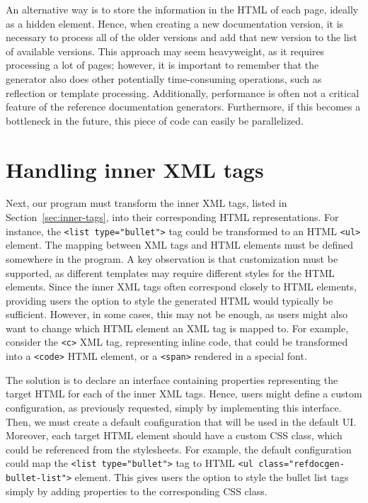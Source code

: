 An alternative way is to store the information in the HTML of each page, ideally as a hidden element. 
Hence, when creating a new documentation version, it is necessary to process all of the older versions and add that new version to the list of available versions.
This approach may seem heavyweight, as it requires processing a lot of pages; however, it is important to remember that the generator also does other potentially time-consuming operations, such as reflection or template processing.
Additionally, performance is often not a critical feature of the reference documentation generators.
Furthermore, if this becomes a bottleneck in the future, this piece of code can easily be parallelized.

\section{Handling inner XML tags}
\label{sec:inner-xml-to-html}

Next, our program must transform the inner XML tags, listed in Section~\ref{sec:inner-tags}, into their corresponding HTML representations.
For instance, the \texttt{<list ty\-pe="bullet">} tag could be transformed to an HTML \texttt{<ul>} element.
The mapping between XML tags and HTML elements must be defined somewhere in the program.
A key observation is that customization must be supported, as different templates may require different styles for the HTML elements.
Since the inner XML tags often correspond closely to HTML elements, providing users the option to style the generated HTML would typically be sufficient.
However, in some cases, this may not be enough, as users might also want to change which HTML element an XML tag is mapped to.
For example, consider the \texttt{<c>} XML tag, representing inline code, that could be transformed into a \texttt{<code>} HTML element, or a \texttt{<span>} rendered in a special font.

The solution is to declare an interface containing properties representing the target HTML for each of the inner XML tags.
Hence, users might define a custom configuration, as previously requested, simply by implementing this interface.
Then, we must create a default configuration that will be used in the default UI.
Moreover, each target HTML element should have a custom CSS class, which could be referenced from the stylesheets.
For example, the default configuration could map the \texttt{<list type="bullet">} tag to HTML \texttt{<ul class="refdocgen-bullet-list">} element.
This gives users the option to style the bullet list tags simply by adding properties to the corresponding CSS class.


